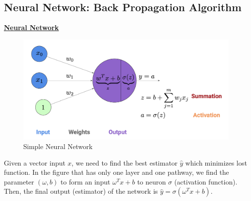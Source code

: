 \documentclass[11pt,a4paper]{article}
\begin{document}
\subsection{Neural Network: Back Propagation Algorithm}
\underline{\textbf{Neural Network}}
\begin{center}\begin{figure}[htbp]
    \centering
    \includegraphics[scale=0.2]{neuron1.png}
    \caption{Simple Neural Network}
    \label{}
\end{figure}\end{center}
Given a vector input $x$, we need to find the best estimator $\hat{y}$ which minimizes lost function. In the figure that has only one layer and one pathway, we find the parameter $(\omega,b)$ to form an input $\omega^Tx+b$ to neuron $\sigma$ (activation function).  Then, the final output (estimator) of the network is $\hat{y}=\sigma(\omega^Tx+b)$.
\end{document}
